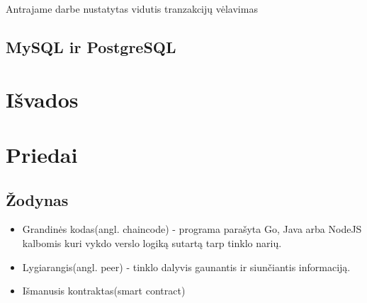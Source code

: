 \documentclass{VUMIFPSkursinis}
\begin{document}
					Antrajame darbe \cite{ThailandPerf} nustatytas vidutis tranzakcijų vėlavimas 
					
									


			

	\subsection{MySQL ir PostgreSQL}

\section{Išvados}

\section{Priedai}
\subsection{Žodynas}
\begin{itemize}
	\item{Grandinės kodas(angl. chaincode) - programa parašyta Go, Java arba NodeJS kalbomis kuri vykdo
 verslo logiką sutartą tarp tinklo narių.}
	\item{Lygiarangis(angl. peer) - tinklo dalyvis gaunantis ir siunčiantis informaciją.}
	\item{Išmanusis kontraktas(smart contract)}
\end{itemize}


\printbibliography[heading=bibintoc]  
\end{document}
